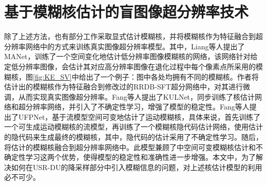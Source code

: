 \section{基于模糊核估计的盲图像超分辨率技术}
除了上述方法，也有部分工作采取显式估计模糊核，并将模糊核作为特征融合到超分辨率网络中的方式来训练真实图像超分辨率模型。其中，Liang等人\parencite{liang2021mutual}提出了MANet，训练了一个空间变化地估计低分辨率图像模糊核的网络，该网络针对给定低分辨率图像，会估计其对应高分辨率图像在退化过程中每个像素点所采用的模糊核，图\ref{fig:KE_SV}中给出了一个例子：图中各处均拥有不同的模糊核。作者将估计出的模糊核作为特征融合到修改过的RRDB-SFT超分网络中，对其进行微调，从而实现真实图像超分辨率。Fang等人\parencite{fang2022uncertainty}提出了KULNet，同步训练了核估计网络和超分辨率网络，并引入了不确定性学习，增强了模型的稳定性。Fang等人\parencite{fangself}提出了UFPNet，基于流模型空间可变地估计了运动模糊核，具体来说，首先训练了一个可生成运动模糊核的流模型，再训练了一个模糊核隐代码估计网络，使用估计的隐代码来生成最终的模糊核，其中，隐代码的估计采用了不确定性学习。随后，将估计的模糊核融合到超分辨率网络中。此模型兼顾了\parencite{liang2021mutual}\parencite{fang2022uncertainty}中空间可变模糊核估计和不确定性学习这两个优势，使得模型的稳定性和准确性进一步增强。本文中，为了解决如何在USR-DU的降采样部分中引入模糊信息的问题，对上述核估计模型的利用必不可少。


\begin{figure}[htbp]
    \centering
    \hfill
\end{figure} 

